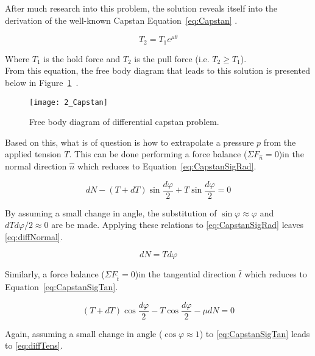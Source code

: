 After much research into this problem, the solution reveals itself into the derivation of the well-known Capstan Equation~\ref{eq:Capstan} \cite{capstanman}.

\begin{equation}
	\label{eq:Capstan}
	T_2 = T_1 e^{\mu\theta}
\end{equation}

Where $T_1$ is the hold force and $T_2$ is the pull force (i.e. $T_2 \geq T_1$). \\

From this equation, the free body diagram that leads to this solution is presented below in Figure~\ref{fig:Capstan}~\cite{capstanman}. 

\begin{figure}[H]
	\centering
	\texttt{[image: 2\_Capstan]}
	\caption[Free body diagram of differential capstan problem.]{Free body diagram of differential capstan problem. \protect\cite{capstanman}}
	\label{fig:Capstan}
\end{figure}

Based on this, what is of question is how to extrapolate a pressure $p$ from the applied tension $T$. This can be done performing a force balance ($\Sigma F_{\hat{n}} = 0 $)in the normal direction $\hat{n}$ which reduces to Equation~\ref{eq:CapstanSigRad}.

\begin{equation}
	\label{eq:CapstanSigRad}
	dN-(T+dT)\sin \frac{d\varphi}{2}+T\sin \frac{d\varphi}{2}= 0
\end{equation}

By assuming a small change in angle, the substitution of $\sin \varphi \approx \varphi$ and $dT d\varphi/2 \approx 0$ are be made. Applying these relations to \ref{eq:CapstanSigRad} leaves \ref{eq:diffNormal}.

\begin{equation}
	\label{eq:diffNormal}
	dN = T d\varphi
\end{equation}


Similarly, a force balance ($\Sigma F_{\hat{t}} = 0 $)in the tangential direction $\hat{t}$ which reduces to Equation~\ref{eq:CapstanSigTan}.

\begin{equation}
	\label{eq:CapstanSigTan}
	(T+dT)\cos \frac{d\varphi}{2}- T\cos \frac{d\varphi}{2} - \mu dN= 0
\end{equation}

Again, assuming a small change in angle ($\cos \varphi \approx 1$) to \ref{eq:CapstanSigTan} leads to \ref{eq:diffTens}.

